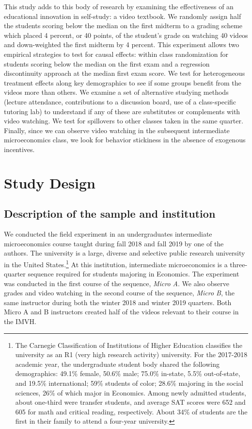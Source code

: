 \documentclass[12pt]{article}
\begin{document}
This study adds to this body of research by examining the effectiveness of an educational innovation in self-study: a video textbook. We randomly assign half the students scoring below the median on the first midterm to a grading scheme which placed 4 percent, or 40 points, of the student's grade on watching 40 videos and down-weighted the first midterm by 4 percent. This experiment allows two empirical strategies to test for causal effects: within class randomization for students scoring below the median on the first exam and a regression discontinuity approach at the median first exam score. We test for heterogeneous treatment effects along key demographics to see if some groups benefit from the videos more than others. We examine a set of alternative studying methods (lecture attendance, contributions to a discussion board, use of a class-specific tutoring lab) to understand if any of these are substitutes or complements with video watching. We test for spillovers to other classes taken in the same quarter. Finally, since we can observe video watching in the subsequent intermediate microeconomics class, we look for behavior stickiness in the absence of exogenous incentives.


\section{Study Design} \label{studydesign}

\subsection{Description of the sample and institution}

We conducted the field experiment in an undergraduates intermediate microeconomics course taught during fall 2018 and fall 2019 by one of the authors. The university is a large, diverse and selective public research university in the United States.\footnote{The Carnegie Classification of Institutions of Higher Education classifies the university as an R1 (very high research activity) university. For the 2017-2018 academic year, the undergraduate student body shared the following demographics: 49.1\% female, 50.6\% male; 75.0\% in-state, 5.5\% out-of-state, and 19.5\% international; 59\% students of color; 28.6\% majoring in the social sciences, 26\% of which major in Economics. Among newly admitted students, about one-third were transfer students, and average SAT scores were 652 and 605 for math and critical reading, respectively. About 34\% of students are the first in their family to attend a four-year university.} At this institution, intermediate microeconomics is a three-quarter sequence required for students majoring in Economics. The experiment was conducted in the first course of the sequence, \textit{Micro A}. We also observe grades and video watching in the second course of the sequence, \textit{Micro B}, the same instructor during both the winter 2018 and winter 2019 quarters. Both Micro A and B instructors created half of the videos relevant to their course in the IMVH.
\end{document}
